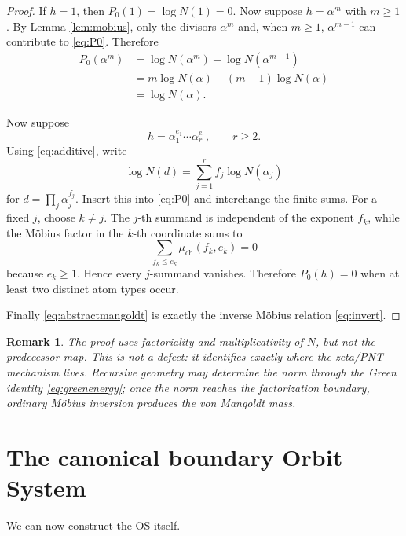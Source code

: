 \documentclass[11pt]{article}
\newtheorem{remark}[theorem]{Remark}
\begin{document}
\begin{proof}
If $h=1$, then $P_0(1)=\log N(1)=0$. Now suppose $h=\alpha^m$ with $m\ge1$. By Lemma \ref{lem:mobius}, only the divisors $\alpha^m$ and, when $m\ge1$, $\alpha^{m-1}$ can contribute to \eqref{eq:P0}. Therefore
\[
\begin{aligned}
P_0(\alpha^m)
&=\log N(\alpha^m)-\log N(\alpha^{m-1})\\
&=m\log N(\alpha)-(m-1)\log N(\alpha)\\
&=\log N(\alpha).
\end{aligned}
\]

Now suppose
\[
h=\alpha_1^{e_1}\cdots\alpha_r^{e_r},\qquad r\ge2.
\]
Using \eqref{eq:additive}, write
\[
\log N(d)=\sum_{j=1}^r f_j\log N(\alpha_j)
\]
for $d=\prod_j\alpha_j^{f_j}$. Insert this into \eqref{eq:P0} and interchange the finite sums. For a fixed $j$, choose $k\ne j$. The $j$-th summand is independent of the exponent $f_k$, while the M\"obius factor in the $k$-th coordinate sums to
\[
\sum_{f_k\le e_k}\mu_{\mathrm{ch}}(f_k,e_k)=0
\]
because $e_k\ge1$. Hence every $j$-summand vanishes. Therefore $P_0(h)=0$ when at least two distinct atom types occur.

Finally \eqref{eq:abstractmangoldt} is exactly the inverse M\"obius relation \eqref{eq:invert}.
\end{proof}

\begin{remark}
The proof uses factoriality and multiplicativity of $N$, but not the predecessor map. This is not a defect: it identifies exactly where the zeta/PNT mechanism lives. Recursive geometry may determine the norm through the Green identity \eqref{eq:greenenergy}; once the norm reaches the factorization boundary, ordinary M\"obius inversion produces the von Mangoldt mass.
\end{remark}

\section{The canonical boundary Orbit System}

We can now construct the OS itself.
\end{document}
